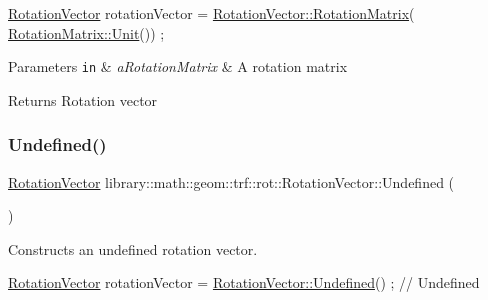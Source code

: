\begin{DoxyCode}
\hyperlink{classlibrary_1_1math_1_1geom_1_1trf_1_1rot_1_1_rotation_vector_a32b1fab5e81bc24d777324daf5849205}{RotationVector} rotationVector = \hyperlink{classlibrary_1_1math_1_1geom_1_1trf_1_1rot_1_1_rotation_vector_a87fd9cff1e806199ed150569a6e98889}{RotationVector::RotationMatrix}(
      \hyperlink{classlibrary_1_1math_1_1geom_1_1trf_1_1rot_1_1_rotation_matrix_aac59b7dafc34767d24d0934f4b86bef0}{RotationMatrix::Unit}()) ;
\end{DoxyCode}



\begin{DoxyParams}[1]{Parameters}
\mbox{\tt in}  & {\em a\+Rotation\+Matrix} & A rotation matrix \\
\hline
\end{DoxyParams}
\begin{DoxyReturn}{Returns}
Rotation vector 
\end{DoxyReturn}
\mbox{\label{classlibrary_1_1math_1_1geom_1_1trf_1_1rot_1_1_rotation_vector_a2641dcca56e633f5639bbcb9dcb02fa2}} 
\subsubsection{\texorpdfstring{Undefined()}{Undefined()}}
{\footnotesize\ttfamily \hyperlink{classlibrary_1_1math_1_1geom_1_1trf_1_1rot_1_1_rotation_vector}{Rotation\+Vector} library\+::math\+::geom\+::trf\+::rot\+::\+Rotation\+Vector\+::\+Undefined (\begin{DoxyParamCaption}{ }\end{DoxyParamCaption})\hspace{0.3cm}{\ttfamily [static]}}



Constructs an undefined rotation vector. 


\begin{DoxyCode}
\hyperlink{classlibrary_1_1math_1_1geom_1_1trf_1_1rot_1_1_rotation_vector_a32b1fab5e81bc24d777324daf5849205}{RotationVector} rotationVector = \hyperlink{classlibrary_1_1math_1_1geom_1_1trf_1_1rot_1_1_rotation_vector_a2641dcca56e633f5639bbcb9dcb02fa2}{RotationVector::Undefined}() ; \textcolor{comment}{//
       Undefined}
\end{DoxyCode}


